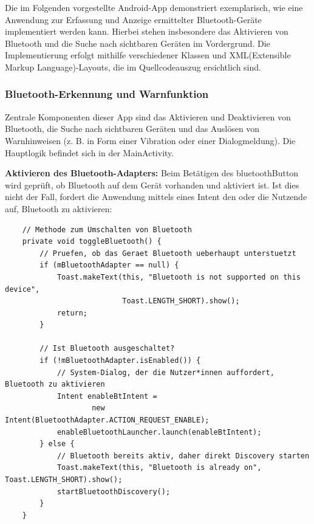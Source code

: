 \documentclass[a4paper, 12pt]{article} %
\begin{document}
\begin{spacing}{1.8}  %
\fontsize{14pt}{15pt}\selectfont  %

Die im Folgenden vorgestellte Android-App demonstriert exemplarisch, wie eine Anwendung zur Erfassung und Anzeige ermittelter Bluetooth-Geräte 
implementiert werden kann. Hierbei stehen insbesondere das Aktivieren von Bluetooth und die Suche nach sichtbaren Geräten im Vordergrund. 
Die Implementierung erfolgt mithilfe verschiedener Klassen und XML(Extensible Markup Language)-Layouts, die im Quellcodeauszug ersichtlich sind.

\subsubsection{Bluetooth-Erkennung und Warnfunktion}

Zentrale Komponenten dieser App sind das Aktivieren und Deaktivieren von Bluetooth, die Suche nach sichtbaren Geräten und das Auslösen von 
Warnhinweisen (z. B. in Form einer Vibration oder einer Dialogmeldung). Die Hauptlogik befindet sich in der MainActivity\cite{lukiano12_lkw_assist}.

\textbf{Aktivieren des Bluetooth-Adapters\cite{lukiano12_lkw_assist}:} Beim Betätigen des bluetoothButton wird geprüft, ob Bluetooth auf dem Gerät vorhanden und aktiviert ist. 
Ist dies nicht der Fall, fordert die Anwendung mittels eines Intent den oder die Nutzende auf, Bluetooth zu aktivieren:

\begin{lstlisting}
    // Methode zum Umschalten von Bluetooth
    private void toggleBluetooth() {
        // Pruefen, ob das Geraet Bluetooth ueberhaupt unterstuetzt
        if (mBluetoothAdapter == null) {
            Toast.makeText(this, "Bluetooth is not supported on this device",
                           Toast.LENGTH_SHORT).show();
            return;
        }
    
        // Ist Bluetooth ausgeschaltet?
        if (!mBluetoothAdapter.isEnabled()) {
            // System-Dialog, der die Nutzer*innen auffordert, Bluetooth zu aktivieren
            Intent enableBtIntent =
                    new Intent(BluetoothAdapter.ACTION_REQUEST_ENABLE);
            enableBluetoothLauncher.launch(enableBtIntent);
        } else {
            // Bluetooth bereits aktiv, daher direkt Discovery starten
            Toast.makeText(this, "Bluetooth is already on", Toast.LENGTH_SHORT).show();
            startBluetoothDiscovery();
        }
    }
    \end{lstlisting}


\end{spacing}
\end{document}
